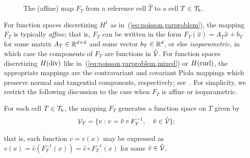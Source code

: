 \begin{figure}%
\bwfig
  \caption{The (affine) map $F_T$ from a reference cell $\hat{T}$
    to a cell $T \in \mathcal{T}_h$.}
  \label{fig:kirby-7:affinemap}
\end{figure}

%
For function spaces discretizing $H^1$ as
in~(\ref{eq:poisson,varproblem}), the mapping $F_T$ is typically
\emph{affine}; that is, $F_T$ can be written in the form $F_T(\hat{x})
= A_T \hat{x} + b_T$ for some matrix $A_T \in \mathbb{R}^{d\times d}$ and some
vector $b_T \in \mathbb{R}^d$, or else \emph{isoparametric}, in which case the
components of $F_T$ are functions in $\hat{\mathcal{V}}$. For function
spaces discretizing $H(\mathrm{div})$ like
in~(\ref{eq:poisson,varproblem,mixed}) or $H(\mathrm{curl})$, the appropriate
mappings are the contravariant and covariant Piola mappings which
preserve normal and tangential components, respectively;
see~\citet{RognesKirbyLogg2009}. For simplicity, we restrict the
following discussion to the case when $F_T$ is affine or
isoparametric.

For each cell $T \in \mathcal{T}_h$, the mapping $F_T$ generates a
function space on $T$ given by
\begin{equation}
  \mathcal{V}_T = \{ v : v = \hat{v} \circ F_T^{-1}, \quad \hat{v} \in
  \hat{\mathcal{V}} \};
\end{equation}

\pagebreak

\noindent
that is, each function $v = v(x)$ may be expressed as $v(x) =
\hat{v}(F_T^{-1}(x)) = \hat{v} \circ F_T^{-1} (x)$ for some $\hat{v}
\in \hat{\mathcal{V}}$.

